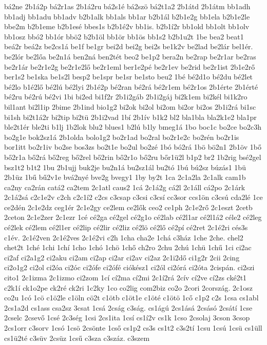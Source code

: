 {bá2ne
2b1á2p
bá2r1as
2b1á2ru
bá2s1é
bá2szö
bá2t1a2
2b1átd
2b1átm
bb1adh
bb1adj
bb1adu
bb1adv
b2b1alk
bb1als
bb1ar
b2b1ál
b2b1e2g
bb1ela
b2b1e2le
bbe2m
b2b1eme
b2b1esé
bbes1s
b2b1é2v
bb1is.
b2b1í2r
bb1old
bb1olt
bb1olv
bb1osz
bbó2
bb1ór
bbö2
b2b1öl
bb1ör
bb1ös
bb1s2
b2b1u2t
1be
bea2
beat1
beá2r
beá2z
be2cs1á
be1f
be1gr
bei2d
bei2g
bei2s
be1k2v
be2lad
be2lár
bel1ér.
be2lór
be2lőa
be2n1á
ben2ná
ben2tét
beo2
be1p2
bera2n
be2rap
be2r1ar
be2ras
be2r1ár
be2r1e2g
be2r1e2lő
be2r1eml
ber1e2pé
be2r1ev
be2rid
be2r1ist
2b1e2rő
ber1s2
be1ska
be1s2l
besp2
be1spr
be1sr
be1sto
beu2
1bé
bé2d1o
bé2du
bé2let
bé2lo
b1é2lő
bé2lú
bé2lyi
2b1é2p
bé2ran
bé2rá
bé2r1em
bé2r1os
2b1érte
2b1érté
bé2ru
bé2rú
bé2vi
1bi
bi2ed
bi1f2r
2b1i2gáb
2b1i2gáj
bi2k1em
bi2kél
bi1k2ro
bil1ant
bi2l1ip
2bime
2b1ind
bio1g2
bi2ok
bi2ol
bi2om
bi2or
bi2os
2b1i2rá
bi1sc
bi1sh
bi2t1á2r
bi2tip
bi2tü
2b1i2vad
1bí
2b1ív
b1k2
bl2
bla1bla
bla2k1e2
bla1pr
ble2t1ér
ble2ti
b1lj
1b2lok
blu2
blues1
b2lú
b1ly
bmeg1á
1bo
boc1c
bo2ce
bo2c3h
bo2g1e
bok2sz1á
2b1olda
bolo1g2
bo2r1ad
bo2ral
bo2r1e2c
bo2rén
bo2r1is
bor1itt
bo2r1iv
bo2se
bos3zs
bo2t1e
bo2ul
bo2zé
1bó
bó2rá
1bö
bö2n1
2b1öv
1bő
bő2r1a
bő2rá
bő2reg
bő2rel
bő2rin
bő2r1o
bő2ru
bőr1ü2l
b1p2
br2
1b2rig
bsé2gel
bsz1t2
b1t2
1bu
2b1ujj
buk2je
bu2n1á
bu2sz1ál
bu2tó
1bú
bú2sz
búzás1
1bü
2b1üz
1bű
bű2v1e
bvá2nyé
bve2g
bvegy1
1by
by2t
1ca
2c1a2la
2c1alk
cam1b
ca2ny
ca2rán
catá2
ca2tem
2c1atl
caus2
1cá
2c1á2g
cá2l
2c1áll
cá2po
2c1árk
2c1á2sá
c2c1e2v
c2ch
c2c1í2
c2cs
c3csap
c3csi
c3csí
cc3sor
ccs1ön
c3csú
cda2lé
1ce
ce2dén
2c1e2dz
ceg1ér
2c1e2gy
ce2lem
ce2lők
ceo2
ce1ph
2c1e2rő
2c1eszt
2cetb
2ceton
2c1e2zer
2c1ezr
1cé
cé2ga
cé2gel
cé2g1o
cé2lab
cé2l1ar
cé2l1á2
céle2
cé2leg
cé2lek
cé2lem
cé2l1er
cé2lip
cé2lir
cé2liz
cé2lö
cé2lő
cé2pí
cé2ret
2c1é2ri
cés3s
c1év.
2c1é2ven
2c1é2ves
2c1é2vi
c2h
1cha
cha2e
1chá
c3ház
1che
2che.
chel2
chet2t
1ché
1chi
1chí
1cho
1chó
1chö
1chő
ch2ro
2chu
2chú
1chü
1chű
1ci
ci2ac
ci2af
ci2a1g2
ci2aku
ci2am
ci2ap
ci2ar
ci2av
ci2az
2c1i2dő
ci1g2r
2cii
2cing
ci2o1g2
ci2ol
ci2óa
ci2óc
ci2ófe
ci2ófé
ciókész1
ci2ól
ci2órá
ci2óta
2cispán.
ci2szi
cito1
2c1izma
2c1izmo
ci2zom
1cí
cí2ma
cí2mi
2c1í2rá
2cív
cí2ve
cí2zs
cké2t1
c2k1í
ck1o2pe
ck2ré
ck2ri
1c2ky
1co
co2lig
com2biz
co2o
2cori
2cország.
2c1osz
co2u
1có
1cö
c1ö2le
c1öln
cö2t
c1ötb
c1öt1e
c1öté
c1ötö
1cő
c1p2
c2s
1csa
cs1abl
2cs1a2d
cs1ass
csa2sz
3csat
1csá
2cság
c3ság.
cs1ágú
2cs1ásá
2csásó
2csátí
1cse
2cselc
2csevő
1csé
2c3ség
1csi
2cs1ita
1csí
cs1í2v
cs1k
1cso
2csolaj
3cson
3csop
2cs1orr
c3sorv
1csó
1csö
2csönte
1cső
cs1p2
cs3s
cs1t2
c3s2tí
1csu
1csú
1csü
cs1üll
cs1ü2té
c3süv
2csüz
1csű
c3sza
c3száz.
c3szem
}
